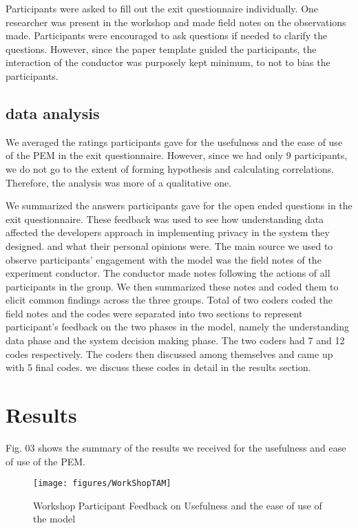 \documentclass{sigchi}
\begin{document}
Participants were asked to fill out the exit questionnaire individually. One researcher was present in the workshop and made field notes on the observations made. Participants were encouraged to ask questions if needed to clarify the questions. However, since the paper template guided the participants, the interaction of the conductor was purposely kept minimum, to not to bias the participants.

\subsection {data analysis}

We averaged the ratings participants gave for the usefulness and the ease of use of the PEM in the exit questionnaire. However, since we had only 9 participants, we do not go to the extent of forming hypothesis and calculating correlations. Therefore, the analysis was more of a qualitative one. 

We summarized the answers participants gave for the open ended questions in the exit questionnaire. These feedback was used to see how understanding data affected the developers approach in implementing privacy in the system they designed. and what their personal opinions were. The main source we used to observe participants' engagement with the model was the field notes of the experiment conductor. The conductor made notes following the actions of all participants in the group. We then summarized these notes and coded them to elicit common findings across the three groups. Total of two coders coded the field notes and the codes were separated into two sections to represent participant's feedback on the two phases in the model, namely the understanding data phase and the system decision making phase. The two coders had 7 and 12 codes respectively. The coders then discussed among themselves and came up with 5 final codes. we discuss these codes in detail in the results section.

\section {Results}

Fig. 03 shows the summary of the results we received for the usefulness and ease of use of the PEM.

\begin{figure}[h]
\begin{center}
\texttt{[image: figures/WorkShopTAM]}
\caption{Workshop Participant Feedback on Usefulness and the ease of use of the model}
\end{center}
\end{figure}
\end{document}
